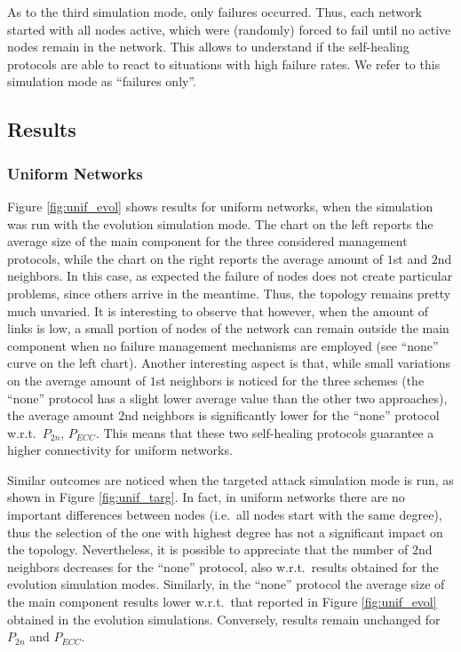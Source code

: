 \documentclass[10pt, conference, compsocconf]{IEEEtran}
\begin{document}
As to the third simulation mode, only failures occurred. Thus, each network started with all nodes active, which were (randomly) forced to fail until no active nodes remain in the network. This allows to understand if the self-healing protocols are able to react to situations with high failure rates. We refer to this simulation mode as ``failures only''.

\subsection{Results}

\subsubsection{Uniform Networks}
Figure \ref{fig:unif_evol} shows results for uniform networks, when the simulation was run with the evolution simulation mode. The chart on the left reports the average size of the main component for the three considered management protocols, while the chart on the right reports the average amount of $1$st and $2$nd neighbors. In this case, as expected the failure of nodes does not create particular problems, since others arrive in the meantime. Thus, the topology remains pretty much unvaried. It is interesting to observe that however, when the amount of links is low, a small portion of nodes of the network can remain outside the main component when no failure management mechanisms are employed (see ``none'' curve on the left chart). 
Another interesting aspect is that, while small variations on the average amount of $1$st neighbors is noticed for the three schemes (the ``none'' protocol has a slight lower average value than the other two approaches), the average amount $2$nd neighbors is significantly lower for the ``none'' protocol w.r.t.~$P_{2n}$, $P_{ECC}$. This means that these two self-healing protocols guarantee a higher connectivity for uniform networks.

Similar outcomes are noticed when the targeted attack simulation mode is run, as shown in Figure \ref{fig:unif_targ}.
In fact, in uniform networks there are no important differences between nodes (i.e.~all nodes start with the same degree), thus the selection of the one with highest degree has not a significant impact on the topology. Nevertheless, it is possible to appreciate that the number of $2$nd neighbors decreases for the ``none'' protocol, also w.r.t.~results obtained for the evolution simulation modes. Similarly, in the ``none'' protocol the average size of the main component results lower w.r.t.~that reported in Figure \ref{fig:unif_evol} obtained in the evolution simulations. Conversely, results remain unchanged for $P_{2n}$ and $P_{ECC}$.
\end{document}
